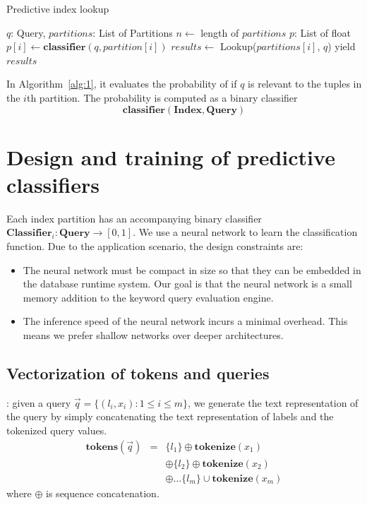 \documentclass[conference]{IEEEtran}
\begin{document}
\begin{algorithm}
	\label{alg:1}
\caption{Predictive index lookup}
\begin{algorithmic}[1]
\REQUIRE $q$: Query, $partitions$: List of Partitions
\STATE $n \leftarrow$ length of $partitions$
\STATE $p$: List of float
  \STATE $p[i] \leftarrow \mathbf{classifier}(q, partition[i])$
\ENDFOR
{}
    \STATE $results \leftarrow$ Lookup($partitions[i]$, $q$)
    \STATE yield $results$
\ENDFOR
\end{algorithmic}
\end{algorithm}

In Algorithm~\ref{alg:1}, it evaluates the probability of if $q$
is relevant to the tuples in the $i$th partition.  The probability
is computed as a binary classifier 
$$\mathbf{classifier}(\mathbf{Index}, \mathbf{Query})$$

\section{Design and training of predictive classifiers}

Each index partition has an accompanying binary classifier $\mathbf{Classifier}_i : \mathbf{Query}\to[0, 1]$.
We use a neural network to learn the classification function.  Due to the application
scenario, the design constraints are:

\begin{itemize}
\item The neural network must be compact in size so that they can be embedded in
	the database runtime system.  Our goal is that the neural network is a small
	memory addition to the keyword query evaluation engine.
\item The inference speed of the neural network incurs a minimal overhead.  This means
	we prefer shallow networks over deeper architectures.
\end{itemize}

\subsection{Vectorization of tokens and queries}

:  given a query $\vec q=\{(l_i,
x_i): 1\leq i \leq m\}$, we generate the text representation of the query by
simply concatenating the text representation of labels and the tokenized query
values.
\begin{eqnarray*}
	\mathbf{tokens}(\vec q) &=& \{l_1\} \oplus \mathbf{tokenize}(x_1)  \\
				&&  \oplus \{l_2\} \oplus \mathbf{tokenize}(x_2) \\
				&& \oplus \dots \{l_m\} \cup \mathbf{tokenize}(x_m)
\end{eqnarray*}
where $\oplus$ is sequence concatenation.
\end{document}
